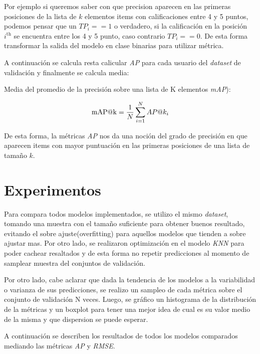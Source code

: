 \documentclass[11pt,a4paper,twoside]{thesis}
\begin{document}
Por ejemplo si queremos saber con que precision aparecen en las primeras posiciones de la lista de $k$ elementos items con calificaciones entre 4 y 5 puntos, podemos pensar que un $TP_i == 1$ o verdadero, si la calificación en la posición $i^\mathrm{th}$ se encuentra entre los 4 y 5 punto, caso contrario $TP_i == 0$. De esta forma transformar la salida del modelo en clase binarias para utilizar métrica.

A continuación se calcula resta calicular \textit{AP\makeatletter@k} para cada usuario  del \textit{dataset} de validación y finalmente se calcula media: 


\begin{description}
	\item[Media del promedio de la precisión sobre una lista de K elementos \textit{mAP\makeatletter@k}):]
\end{description}
\begin{equation}
	\operatorname{mAP\makeatletter@k}=\frac{1}{N} \sum_{i=1}^N AP\makeatletter@k_i
\end{equation}

De esta forma, la métricas \textit{AP\makeatletter@k} nos da una noción del grado de precisión en que aparecen items con mayor puntuación en las primeras posiciones de una lista de tamaño $k$.


\chapter{Experimentos}

Para compara todos modelos implementados, se utilizo el mismo \textit{dataset}, tomando una muestra con el tamaño suficiente para obtener buenos resultado, evitando el sobre ajuste(overfitting) para aquellos modelos que tienden a sobre ajustar mas. Por otro lado, se realizaron optimización en el modelo \textit{KNN} para poder cachear resaltados y de esta forma no repetir predicciones al momento de samplear muestra del conjuntos de validación.

Por otro lado, cabe aclarar que dada la tendencia de los modelos a la variabilidad o varianza de sus predicciones, se realizo un sampleo de cada métrica sobre el conjunto de validación N veces. Luego, se gráfico un histograma de la distribución de la métricas y un boxplot para tener una mejor idea de cual es su valor medio de la misma y que dispersion se puede esperar.


A continuación se describen los resultados de todos los modelos comparados mediando las métricas \textit{AP\makeatletter@k} y \textit{RMSE}.
\end{document}
